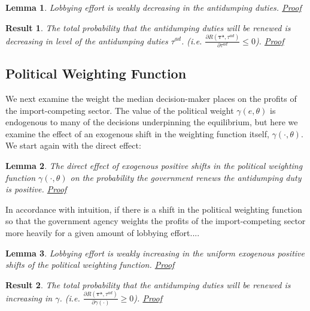 \documentclass[10pt]{article}
\newtheorem{lemma}{Lemma}
\newtheorem{result}{Result}
\newcommand{\ta}{\theta}
\newcommand{\bta}{\bm{\tau^a}}
\newcommand{\tad}{\tau^{ad}}
\newcommand{\ga}{\gamma}
\begin{document}
\begin{lemma}
  Lobbying effort is weakly decreasing in the antidumping duties. \hyperlink{Pr_tad_indir}{Proof}
  \label{res:tad_indir}
\end{lemma}


\begin{result}
	The total probability that the antidumping duties will be renewed is decreasing in level of the antidumping duties $\tad$. (i.e. $\frac{\partial R(\bta,\tad)}{\partial \tad} \leq 0$). \hyperlink{Pr_tad_total}{Proof}
	\label{res:tad_total}
\end{result}




\bigskip
\subsection{Political Weighting Function}
\label{sec:gamma}

We next examine the weight the median decision-maker places on the profits of the import-competing sector. The value of the political weight $\ga(e,\ta)$ is endogenous to many of the decisions underpinning the equilibrium, but here we examine the effect of an exogenous shift in the weighting function itself, $\ga(\cdot,\ta)$. We start again with the direct effect:

\begin{lemma}
  The direct effect of exogenous positive shifts in the political weighting function $\ga(\cdot,\ta)$ on the probability the government renews the antidumping duty is positive. \hyperlink{Pr_ga_dir}{Proof}
	  \label{res:ga_dir}
\end{lemma}

In accordance with intuition, if there is a shift in the political weighting function so that the government agency weights the profits of the import-competing sector more heavily for a given amount of lobbying effort....


\begin{lemma}
  Lobbying effort is weakly increasing in the uniform exogenous positive shifts of the political weighting function. \hyperlink{Pr_ga_indir}{Proof}
  \label{res:ga_indir}
\end{lemma}


\begin{result}
	The total probability that the antidumping duties will be renewed is increasing in $\ga$. (i.e. $\frac{\partial R(\bta,\tad)}{\partial  \ga(\cdot)} \geq 0$). \hyperlink{Pr_ga_total}{Proof}
	\label{res:ga_total}
\end{result}
\end{document}
